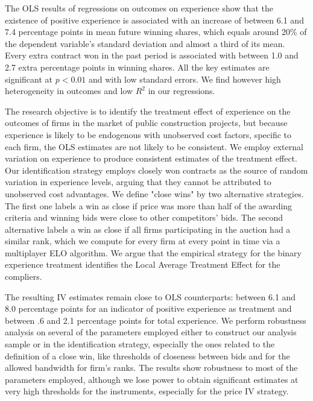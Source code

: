 
The OLS results of regressions on outcomes on experience show that the existence of positive experience is associated with an increase of between 6.1 and 7.4 percentage points in mean future winning shares, which equals around 20\% of the dependent variable's standard deviation and almost a third of its mean. Every extra contract won in the past period is associated with between 1.0 and 2.7 extra percentage points in winning shares. All the key estimates are significant at $p<0.01$ and with low standard errors. We find however high heterogeneity in outcomes and low $R^2$ in our regressions.

 The research objective is to identify the treatment effect of experience on the outcomes of firms in the market of public construction projects, but because experience is likely to be endogenous with unobserved cost factors, specific to each firm, the OLS estimates are not likely to be consistent. We employ external variation on experience to produce consistent estimates of the treatment effect. Our identification strategy employs closely won contracts as the source of random variation in experience levels, arguing that they cannot be attributed to unobserved cost advantages. We define "close wins" by two alternative strategies. The first one labels a win as close if price was more than half of the awarding criteria and winning bids were close to other competitors' bids. The second alternative labels a win as close if all firms participating in the auction had a similar rank, which we compute for every firm at every point in time via a multiplayer ELO algorithm. We argue that the empirical strategy for the binary experience treatment identifies the Local Average Treatment Effect for the compliers.

The resulting IV estimates remain close to OLS counterparts: between 6.1 and 8.0 percentage points for an indicator of positive experience as treatment and between .6 and 2.1 percentage points for total experience. We perform robustness analysis on several of the parameters employed either to construct our analysis sample or in the identification strategy, especially the ones related to the definition of a close win, like thresholds of closeness between bids and for the allowed bandwidth for firm's ranks. The results show robustness to most of the parameters employed, although we lose power to obtain significant estimates at very high thresholds for the instruments, especially for the price IV strategy.

